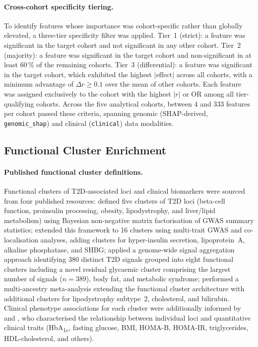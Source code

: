 \paragraph{Cross-cohort specificity tiering.}
To identify features whose importance was cohort-specific rather than globally elevated, a three-tier specificity filter was applied.
Tier~1 (strict): a feature was significant in the target cohort and not significant in any other cohort.
Tier~2 (majority): a feature was significant in the target cohort and non-significant in at least 60\,\% of the remaining cohorts.
Tier~3 (differential): a feature was significant in the target cohort, which exhibited the highest $|\text{effect}|$ across all cohorts, with a minimum advantage of $\Delta r \geq 0.1$ over the mean of other cohorts.
Each feature was assigned exclusively to the cohort with the highest $|r|$ or OR among all tier-qualifying cohorts.
Across the five analytical cohorts, between 4 and 333 features per cohort passed these criteria, spanning genomic (SHAP-derived, \texttt{genomic\_shap}) and clinical (\texttt{clinical}) data modalities.

\subsection*{Functional Cluster Enrichment}

\paragraph{Published functional cluster definitions.}
Functional clusters of T2D-associated loci and clinical biomarkers were sourced from four published resources:
\citet{Udler2018} defined five clusters of T2D loci (beta-cell function, proinsulin processing, obesity, lipodystrophy, and liver/lipid metabolism) using Bayesian non-negative matrix factorisation of GWAS summary statistics;
\citet{Kim2023} extended this framework to 16 clusters using multi-trait GWAS and co-localisation analyses, adding clusters for hyper-insulin secretion, lipoprotein~A, alkaline phosphatase, and SHBG;
\citet{Suzuki2024} applied a genome-wide signal aggregation approach identifying 380 distinct T2D signals grouped into eight functional clusters including a novel residual glycaemic cluster comprising the largest number of signals ($n = 389$), body fat, and metabolic syndrome;
\citet{Smith2024} performed a multi-ancestry meta-analysis extending the functional cluster architecture with additional clusters for lipodystrophy subtype~2, cholesterol, and bilirubin.
Clinical phenotype associations for each cluster were additionally informed by \citet{Mahajan2018} and \citet{Popovic2023}, who characterised the relationship between individual loci and quantitative clinical traits (HbA\textsubscript{1c}, fasting glucose, BMI, HOMA-B, HOMA-IR, triglycerides, HDL-cholesterol, and others).


